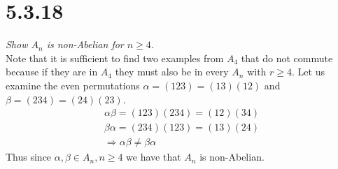 \documentclass[a4paper, 11pt]{article}
\begin{document}
\section*{5.3.18}
\textit{Show $A_n$ is non-Abelian for $n\geq 4$.}\\

\noindent Note that it is sufficient to find two examples from $A_4$ that do not commute because if they are in $A_4$ they must also be in every $A_n$ with $r \geq 4$. Let us examine the even permutations $\alpha = (123) = (13)(12)$  and $\beta = (234)=(24)(23)$. 
	\begin{align*}
		\alpha \beta = (123)(234) = (12)(34) \\ 
		\beta \alpha = (234)(123) = (13)(24) \\ 
		\Rightarrow \alpha \beta \neq \beta \alpha 
	\end{align*}
Thus since $\alpha, \beta \in A_n, n\geq 4$ we have that $A_n$ is non-Abelian. 
\end{document}
